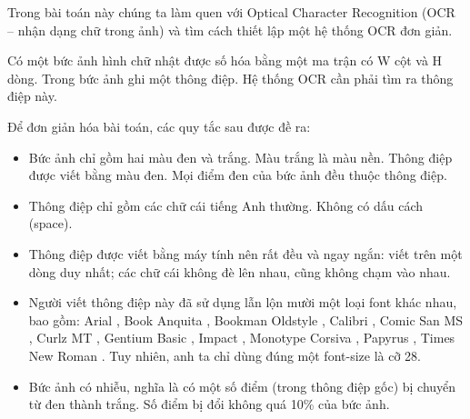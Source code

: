 Trong bài toán này chúng ta làm quen với Optical Character Recognition (OCR – nhận dạng chữ trong ảnh) và tìm cách thiết lập một hệ thống OCR đơn giản.  

   Có một bức ảnh hình chữ nhật được số hóa bằng một ma trận có W cột và H dòng. Trong bức ảnh ghi một thông điệp. Hệ thống OCR cần phải tìm ra thông điệp này.  

   Để đơn giản hóa bài toán, các quy tắc sau được đề ra:  
\begin{itemize}
	\item 

     Bức ảnh chỉ gồm hai màu đen và trắng. Màu trắng là màu nền. Thông điệp được viết bằng màu đen. Mọi điểm đen của bức ảnh đều thuộc thông điệp.    
	\item 

     Thông điệp chỉ gồm các chữ cái tiếng Anh thường. Không có dấu cách (space).    
	\item 

     Thông điệp được viết bằng máy tính nên rất đều và ngay ngắn: viết trên một dòng duy nhất; các chữ cái không đè lên nhau, cũng không chạm vào nhau.    
	\item 

     Người viết thông điệp này đã sử dụng lẫn lộn mười một loại font khác nhau, bao gồm:            Arial           ,            Book Anquita           ,            Bookman Oldstyle           ,            Calibri           ,            Comic San MS           ,            Curlz MT           ,            Gentium Basic           ,            Impact           ,            Monotype Corsiva           ,            Papyrus           ,            Times New Roman           . Tuy nhiên, anh ta chỉ dùng đúng một font-size là cỡ 28.    
	\item 

     Bức ảnh có nhiễu, nghĩa là có một số điểm (trong thông điệp gốc) bị chuyển từ đen thành trắng. Số điểm bị đổi không quá 10\% của bức ảnh.    
\end{itemize}